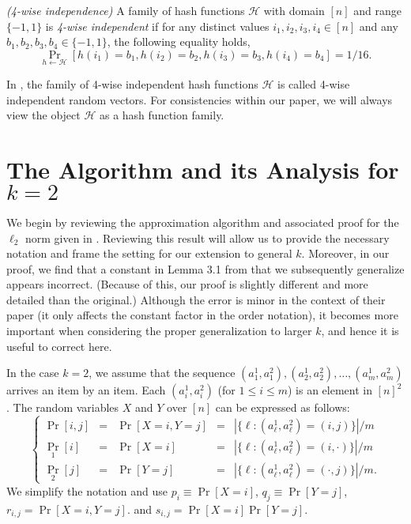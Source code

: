 \def\draft{0}  \documentclass[proceedings]{stacs}
\theoremstyle{plain}\newtheorem{satz}[thm]{Satz}
\theoremstyle{definition}\newtheorem{crucial}[thm]{Crucial Definition}
\begin{document}
\begin{definition}\emph{(4-wise independence)}
A family of hash functions $\mathcal H$ with domain $[n]$ and range $\{-1, 1\}$ is \emph{4-wise independent} if for any distinct values
$i_1, i_2, i_3, i_4 \in [n]$ and any $b_1, b_2, b_3, b_4 \in \{-1, 1\}$, the following equality holds,
$$\Pr_{h \leftarrow \mathcal H}\left[h(i_1) = b_1, h(i_2) = b_2, h(i_3) = b_3, h(i_4) = b_4\right] = 1/16.$$
\end{definition}
\begin{remark}In \cite{IM08}, the family of 4-wise independent hash functions $\mathcal H$ is called 4-wise independent random vectors. For consistencies within our paper, we will always view the object $\mathcal H$ as a hash function family.
\end{remark}

\section{The Algorithm and its Analysis for $k=2$} \label{sec:kis2}
We begin by reviewing the approximation algorithm and associated proof
for the $\ell_2$ norm given in \cite{IM08}. Reviewing this result
will allow us to provide the necessary notation and frame the setting
for our extension to general $k$.  Moreover, in our proof, we find
that a constant in Lemma 3.1 from \cite{IM08} that we subsequently
generalize appears incorrect.  (Because of this, our proof is slightly
different and more detailed than the original.)  Although the error is
minor in the context of their paper (it only affects the constant
factor in the order notation), it becomes more important when
considering the proper generalization to larger $k$, and hence it
is useful to correct here.


In the case $k=2$, we assume that the sequence $(a^1_1, a^2_1), (a^1_2, a^2_2), \dots, (a^1_m, a^2_m)$ arrives an item by an item.
Each $(a^1_i, a^2_i)$ (for $1 \leq i \leq m$) is an element in $[n]^2$. The random variables $X$ and $Y$ over $[n]$ can be expressed
as follows:
\begin{displaymath}
\left\{
\begin{array}{lllll}
\Pr[i, j] & = & \Pr[X = i, Y = j] & = & |\{\ell: (a^1_\ell, a^2_\ell) = (i, j)\}| / m \\
\Pr_1[i] & = & \Pr[X = i] & = & |\{\ell: (a^1_\ell, a^2_\ell) = (i, \cdot)\}| / m \\
\Pr_2[j] & = & \Pr[Y = j] & = & |\{\ell: (a^1_\ell, a^2_\ell) = (\cdot, j)\}| / m.
\end{array}\right.
\end{displaymath}
We simplify the notation and use
$p_i \equiv \Pr[X = i]$, $q_j \equiv \Pr[Y = j]$,
$r_{i,j} = \Pr[X = i, Y = j]$.
and
$s_{i,j} = \Pr[X = i]\Pr[Y = j]$.
\end{document}

